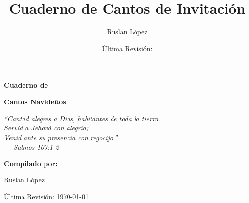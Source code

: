 \documentclass[12pt, spanish]{book}
\title{Cuaderno de Cantos de Invitaci\'on}
\author{Ruslan L\'opez}
\date{\'Ultima Revisi\'on:  \RevDate}
\newcommand{\RevDate}{\today}
\begin{document}
    \hypersetup{pageanchor=false}

    \begin{titlepage}
        \centering

        \vspace*{1cm}

        {\Huge\bfseries\sffamily{$\dagger$}\par}

        \vspace{1.5cm}

        {\Huge\bfseries\sffamily Cuaderno de\par}
        \vspace{0.5cm}
        {\Huge\bfseries\sffamily Cantos Navide\~nos\par}

        \vspace{2cm}

        \begin{center}
            \Large\itshape ``Cantad alegres a Dios, habitantes de toda la tierra.\\
            Servid a Jehov\'a con alegr\'ia;\\
            Venid ante su presencia con regocijo.''\\
            \vspace{0.3cm}
            --- Salmos 100:1-2
        \end{center}

        \vspace{2cm}

        {\Large\bfseries Compilado por:\par}
        \vspace{0.5cm}
        {\Large Ruslan L\'opez\par}

        \vfill

        {\large \'Ultima Revisi\'on: \RevDate\par}

        \vspace{1cm}

    \end{titlepage}

    \hypersetup{pageanchor=true}
    \ifWordBk
    \twocolumn
    \fi
\end{document}

